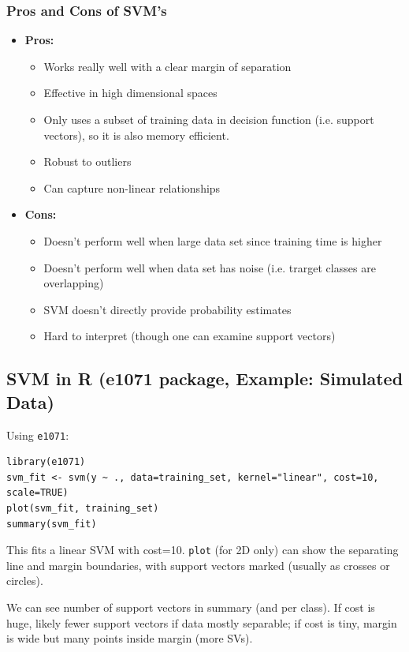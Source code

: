 \documentclass[11pt]{article}
\begin{document}
\subsubsection{Pros and Cons of SVM's}
\begin{itemize}
    \item \textbf{Pros:}
        \begin{itemize}
            \item Works really well with a clear margin of separation
            \item Effective in high dimensional spaces
            \item Only uses a subset of training data in decision function (i.e. support vectors), so it is also memory efficient.
            \item Robust to outliers
            \item Can capture non-linear relationships
        \end{itemize}
    \item \textbf{Cons:}
        \begin{itemize}
            \item Doesn't perform well when large data set since training time is higher
            \item Doesn't perform well when data set has noise (i.e. trarget classes are overlapping)
            \item SVM doesn't directly provide probability estimates
            \item Hard to interpret (though one can examine support vectors)
        \end{itemize}
\end{itemize}

\subsection{SVM in R (e1071 package, Example: Simulated Data)}
Using \texttt{e1071}:
\begin{verbatim}
library(e1071)
svm_fit <- svm(y ~ ., data=training_set, kernel="linear", cost=10, scale=TRUE)
plot(svm_fit, training_set)
summary(svm_fit)
\end{verbatim}
This fits a linear SVM with cost=10. \texttt{plot} (for 2D only) can show the separating line and margin boundaries, with support vectors marked (usually as crosses or circles). 

We can see number of support vectors in summary (and per class). If cost is huge, likely fewer support vectors if data mostly separable; if cost is tiny, margin is wide but many points inside margin (more SVs).
\end{document}
